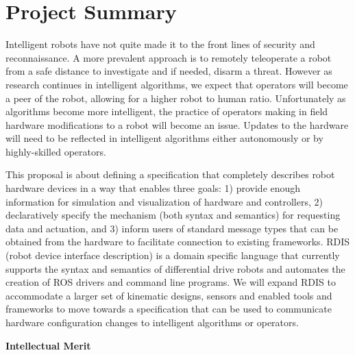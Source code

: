 
\section*{\vspace{-2em}\center Project Summary}

Intelligent robots have not quite made it to the front lines of security and reconnaissance.  A more prevalent approach is to remotely teleoperate a robot from a safe distance to investigate and if needed, disarm a threat.  However as research continues in intelligent algorithms, we expect that operators will become a peer of the robot, allowing for a higher robot to human ratio.  Unfortunately as algorithms become more intelligent, the practice of operators making in field hardware modifications to a robot will become an issue.  Updates to the hardware will need to be reflected in intelligent algorithms either autonomously or by highly-skilled operators.  

This proposal is about defining a specification that completely describes robot hardware devices in a way that enables three goals: 1) provide enough information for simulation and visualization of hardware and controllers, 2) declaratively specify the mechanism (both syntax and semantics) for requesting data and actuation, and 3) inform users of standard message types that can be obtained from the hardware to facilitate connection to existing frameworks.  RDIS (robot device interface description) is a domain specific language that currently supports the syntax and semantics of differential drive robots and automates the creation of ROS drivers and command line programs.  We will expand RDIS to accommodate a larger set of kinematic designs, sensors and enabled tools and frameworks to move towards a specification that can be used to communicate hardware configuration changes to intelligent algorithms or operators. 

%
%  

\textbf{Intellectual Merit}

